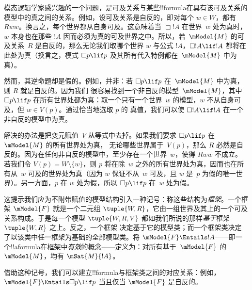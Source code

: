 \documentclass[../../../include/open-logic-section]{subfiles}
\begin{document}


模态逻辑学家感兴趣的一个问题，是可及关系与某些!!{formula}在具有该可及关系的模型中的真之间的关系。例如，设可及关系是自反的，即对每个 $w
\in W$，都有 $Rww$。换言之，每个世界都从自身可及。这意味着当 $\Box !A$ 在世界~$w$ 处为真时，$w$
本身也在那些 $!A$ 因而必须为真的可及世界之中。所以，若~$\mModel{M}$ 的可及关系~$R$ 是自反的，那么无论我们取哪个世界 $w$ 与公式 $!A$，$\Box !A
\lif !A$ 都将在此处为真（换言之，模式 $\Box p \lif
p$ 及其所有代入特例都在~$\mModel{M}$ 中为真）。

然而，其逆命题却是假的。例如，并非：若 $\Box p \lif p$ 在~$\mModel{M}$ 中为真，则 $R$ 就是自反的。因为我们
很容易找到一个非自反的模型~$\mModel{M}$，其中 $\Box p \lif
p$ 在所有世界处都为真：取一个只有一个世界~$w$ 的模型，$w$ 不从自身可及，但 $w \in V(p)$。通过恰当地选取 $p$ 的
真值，我们可以使 $\Box !A \lif !A$ 在一个非自反的模型中为真。

解决的办法是把变元赋值~$V$ 从等式中去掉。如果我们要求 $\Box p \lif p$ 在~$\mModel{M}$ 的所有世界处为真，
无论哪些世界属于~$V(p)$，那么 $R$ 必然是自反的。因为在任何非自反的模型中，至少存在一个世界~$w$，使得
$Rww$ 不成立。若我们令 $V(p) =
W \setminus \{w\}$，则 $p$ 将在除~$w$ 之外的所有世界处为真，因而也在所有从~$w$ 可及的世界处为真（因为 $w$ 保证不从~$w$ 可及，且 $w$ 是~$p$ 为假的唯一世界）。另一方面，$p$ 在 $w$ 处为假，所以 $\Box
p \lif p$ 在~$w$ 处为假。

这提示我们应为不附带赋值的模型结构引入一种记号：称这些结构为\emph{框架}。一个框架 $\mModel{F}$
就是一个二元组 $\tuple{W, R}$，它由一组世界及其上的一个可及关系构成。于是每一个模型 $\tuple{W, R, V}$ 都如我们所说的那样\emph{基于}框架 $\tuple{W, R}$ 之上。反之，一个框架
决定基于它的模型类；而一个框架类决定了以该类中任一框架为基础的全部模型类。将 $\mModel{F} \Entails !A$——即一个!!a{formula}在框架中\emph{有效}的概念——定义为：对所有基于~$\mModel{F}$ 的 $\mModel{M}$，均有 $\mSat{M}{!A}$。

借助这种记号，我们可以建立!!{formula}与框架类之间的对应关系：例如，$\mModel{F} \Entails \Box p \lif p$
当且仅当 $\mModel{F}$ 是自反的。
\end{document}
